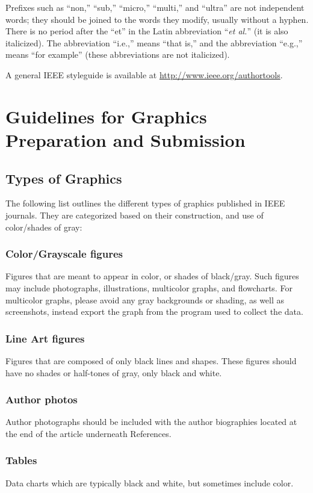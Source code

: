 \documentclass{ieeeaccess}
\begin{document}
Prefixes such as ``non,'' ``sub,'' ``micro,'' ``multi,'' and ``ultra'' are
not independent words; they should be joined to the words they modify,
usually without a hyphen. There is no period after the ``et'' in the Latin
abbreviation ``\emph{et al.}'' (it is also italicized). The abbreviation ``i.e.,'' means
``that is,'' and the abbreviation ``e.g.,'' means ``for example'' (these
abbreviations are not italicized).

A general IEEE styleguide is available at \break
\underline{http://www.ieee.org/authortools}.

\section{Guidelines for Graphics Preparation and Submission}
\label{sec:guidelines}

\subsection{Types of Graphics}
The following list outlines the different types of graphics published in
IEEE journals. They are categorized based on their construction, and use of
color/shades of gray:

\subsubsection{Color/Grayscale figures}
{Figures that are meant to appear in color, or shades of black/gray. Such
figures may include photographs, illustrations, multicolor graphs, and
flowcharts. For multicolor graphs, please avoid any gray backgrounds or shading, as well as screenshots, instead export the graph from the program used to collect the data.}

\subsubsection{Line Art figures}
{Figures that are composed of only black lines and shapes. These figures
should have no shades or half-tones of gray, only black and white.}

\subsubsection{Author photos}
{Author photographs should be included with the author biographies located at the end of the article underneath References. }

\subsubsection{Tables}
{Data charts which are typically black and white, but sometimes include
color.}
\end{document}
